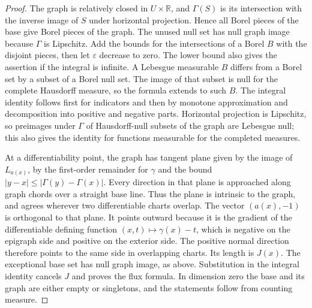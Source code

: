 \documentclass[11pt,oneside,openany]{book}
\theoremstyle{definition}
\theoremstyle{remark}
\begin{document}
\begin{proof}
The graph is relatively closed in \(U\times\mathbb R\), and
\(\Gamma(S)\) is its intersection with the inverse image of
\(S\) under horizontal projection. Hence all Borel pieces of
the base give Borel pieces of the graph. The unused null set
has null graph image because \(\Gamma\) is Lipschitz. Add the
bounds for the intersections of a Borel \(B\) with the
disjoint pieces, then let \(\varepsilon\) decrease to zero.
The lower bound also gives the assertion if the integral is
infinite. A Lebesgue measurable \(B\) differs from a Borel
set by a subset of a Borel null set. The image of that subset
is null for the complete Hausdorff measure, so the formula
extends to such \(B\). The integral identity follows first
for indicators and then by monotone approximation and
decomposition into positive and negative parts. Horizontal
projection is Lipschitz, so preimages under \(\Gamma\) of
Hausdorff-null subsets of the graph are Lebesgue null; this
also gives the identity for functions measurable for the
completed measures.

At a differentiability point, the graph has tangent plane
given by the image of \(L_{a(x)}\), by the first-order remainder
for \(\gamma\) and the bound \(|y-x|\leq|\Gamma(y)-\Gamma(x)|\).
Every direction in that plane is approached along graph chords
over a straight base line. Thus the plane is intrinsic to the
graph, and agrees wherever two differentiable charts overlap.
The vector \((a(x),-1)\) is orthogonal to that plane. It points
outward because it is the gradient of the differentiable defining
function \((x,t)\mapsto\gamma(x)-t\), which is negative on the
epigraph side and positive on the exterior side. The positive
normal direction therefore points to the same side in
overlapping charts. Its length is \(J(x)\). The exceptional base
set has null graph image, as above. Substitution in the
integral identity cancels \(J\) and proves the flux formula.
In dimension zero the base and its graph are either empty
or singletons, and the statements follow from counting measure.
\end{proof}
\end{document}
